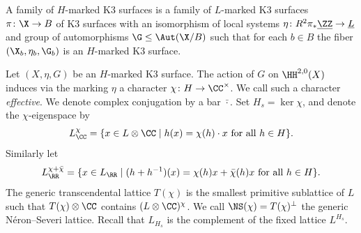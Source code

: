 A family of $H$-marked K3 surfaces is a family of $L$-marked K3 surfaces
$\pi \colon \X \to B$ of K3 surfaces with an isomorphism of local systems $\eta \colon R^2\pi_*\underline{\ZZ} \to \underline{L}$ and group of automorphisms $\G \leq \Aut(\X/B)$ such that for each $b\in B$ the fiber $(\X_b,\eta_b,\G_b)$ is an $H$-marked K3 surface.

Let $(X,\eta,G)$ be an $H$-marked K3 surface. The action of $G$ on $\HH^{2,0}(X)$ induces via the marking $\eta$ a character $\chi\colon H \rightarrow \CC^\times$. We call such a character \emph{effective}. We denote complex conjugation by a bar $\bar\cdot$.
Set $H_s = \ker \chi$, and denote the $\chi$-eigenspace by
\[L_\CC^\chi = \{x \in L \otimes \CC \mid h(x) = \chi(h)\cdot x  \mbox{ for all }h \in H\}.\]
 Similarly let
\[L_\RR^{\chi+\bar\chi}=\{x \in L_\RR \mid (h+h^{-1})(x) = \chi(h)x+\bar \chi(h)x \text{ for all } h \in H\}.\]
The generic transcendental lattice $T(\chi)$ is the smallest primitive sublattice of $L$ such that $T(\chi) \otimes \CC$ contains $(L\otimes \CC)^\chi$. We call
$\NS(\chi) = T(\chi)^\perp$ the generic N\'eron--Severi lattice.
Recall that $L_{H_s}$ is the complement of the fixed lattice $L^{H_s}$.


